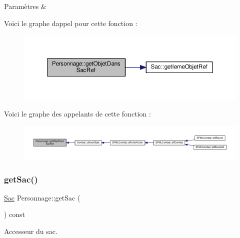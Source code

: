 \begin{DoxyParams}{Paramètres}
{\em } & \\
\hline
\end{DoxyParams}
Voici le graphe d\textquotesingle{}appel pour cette fonction \+:\nopagebreak
\begin{figure}[H]
\begin{center}
\leavevmode
\includegraphics[width=350pt]{class_personnage_a6b3462a550a38c9e9163495c2b2015f4_cgraph}
\end{center}
\end{figure}
Voici le graphe des appelants de cette fonction \+:\nopagebreak
\begin{figure}[H]
\begin{center}
\leavevmode
\includegraphics[width=350pt]{class_personnage_a6b3462a550a38c9e9163495c2b2015f4_icgraph}
\end{center}
\end{figure}
\mbox{\label{class_personnage_aa6dd3ce808644f01d0cdb891f67e896c}} 
\subsubsection{\texorpdfstring{get\+Sac()}{getSac()}}
{\footnotesize\ttfamily \hyperlink{class_sac}{Sac} Personnage\+::get\+Sac (\begin{DoxyParamCaption}{ }\end{DoxyParamCaption}) const}



Accesseur du sac. 

